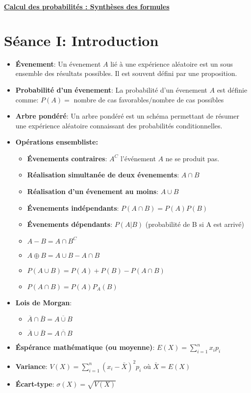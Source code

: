\documentclass[a4paper,11pt]{report}
\begin{document}
\renewcommand{\labelitemi}{$\cdot$}
\renewcommand{\labelitemii}{$\diamond$}
\renewcommand{\labelitemiii}{$\cdot$}
\begin{Large}\begin{center} 
   \underline{\textbf{Calcul des probabilités :  Synthèses des formules}} 
\end{center}\end{Large}

\section{Séance I: Introduction}
\begin{itemize}
	\item \textbf{Évenement}: Un évenement $A$ lié à une expérience aléatoire est un sous ensemble des résultats possibles. Il est souvent défini par une proposition.
	\item \textbf{Probabilité d'un évenement}: La probabilité d'un évenement $A$ est définie comme: $P(A)=$ nombre de cas favorables$/$nombre de cas possibles
	\item \textbf{Arbre pondéré}: Un arbre pondéré est un schéma permettant de résumer une expérience aléatoire connaissant des probabilités conditionnelles.
	\item \textbf{Opérations ensembliste:}
		\begin{itemize}
			\item \textbf{Évenements contraires}: $A^C$ l'événement $A$ ne se produit pas.
			\item \textbf{Réalisation simultanée de deux évenements}: $A \cap B$
			\item \textbf{Réalisation d'un évenement au moins}: $A \cup B$
			\item \textbf{Évenements indépendants}: $P(A \cap B) = P(A) P(B)$
			\item \textbf{Évenements dépendants}: $P(A|B)$ (probabilité de B si A est arrivé)
			\item $A - B = A \cap B^C$
			\item $A \oplus B = A \cup B - A \cap B$
			\item $P(A \cup B) = P(A)+P(B)-P(A \cap B)$
			\item $P(A \cap B) = P(A)P_A(B)$
		\end{itemize}
	\item \textbf{Lois de Morgan}:
		\begin{itemize}
			\item $\overline{A} \cap \overline{B} = \overline{A \cup B}$
			\item $\overline{A} \cup \overline{B} = \overline{A \cap B}$
		\end{itemize}
	\item \textbf{Éspérance mathématique (ou moyenne)}: $E(X)=\sum\limits_{i=1}^{n}{x_ip_i}$
	\item \textbf{Variance}: $V(X)=\sum\limits_{i=1}^{n}{(x_i-\bar{X})^2p_i}$ où $\bar{X} = E(X)$
	\item \textbf{Écart-type}: $\sigma(X) = \sqrt{V(X)}$
\end{itemize}
\end{document}
